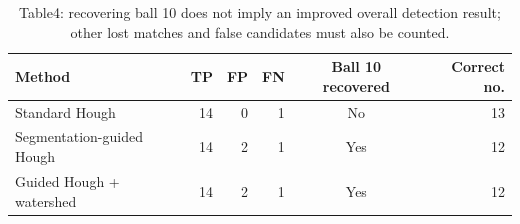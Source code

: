 \begin{table}[htbp]
\centering
\small
\caption{Table4: recovering ball 10 does not imply an improved overall detection result; other lost matches and false candidates must also be counted.}
\label{tab:segmentation-hough-table4}
\begin{tabular}{lrrrcr}
\toprule
Method & TP & FP & FN & Ball 10 recovered & Correct no. \\
\midrule
Standard Hough & 14 & 0 & 1 & No & 13 \\
Segmentation-guided Hough & 14 & 2 & 1 & Yes & 12 \\
Guided Hough + watershed & 14 & 2 & 1 & Yes & 12 \\
\bottomrule
\end{tabular}
\end{table}
\FloatBarrier
